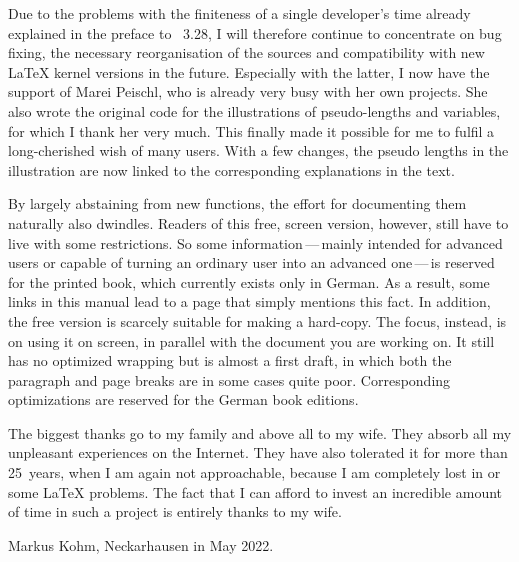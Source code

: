 Due to the problems with the finiteness of a single developer's time already
explained in the preface to \KOMAScript~3.28, I will therefore continue to
concentrate on bug fixing, the necessary reorganisation of the sources and
compatibility with new \LaTeX{} kernel versions in the future. Especially with
the latter, I now have the support of Marei Peischl, who is already very busy
with her own projects. She also wrote the original code for the illustrations
of pseudo-lengths and variables, for which I thank her very much. This finally
made it possible for me to fulfil a long-cherished wish of many users. With a
few changes, the pseudo lengths in the illustration are now linked to the
corresponding explanations in the text.


By largely abstaining from new functions, the effort for documenting them
naturally also dwindles. Readers of this free, screen version, however, still
have to live with some restrictions. So some information\,---\,mainly intended
for advanced users or capable of turning an ordinary user into an advanced
one\,---\,is reserved for the printed book, which currently exists only in
German. As a result, some links in this manual lead to a page that simply
mentions this fact. In addition, the free version is scarcely suitable for
making a hard-copy. The focus, instead, is on using it on screen, in parallel
with the document you are working on. It still has no optimized wrapping but
is almost a first draft, in which both the paragraph and page breaks are in
some cases quite poor. Corresponding optimizations are reserved for the German
book editions.


The biggest thanks go to my family and above all to my wife. They absorb all
my unpleasant experiences on the Internet. They have also tolerated it for
more than 25~years, when I am again not approachable, because I am completely
lost in \KOMAScript{} or some \LaTeX{} problems. The fact that I can afford to
invest an incredible amount of time in such a project is entirely thanks to my
wife.

\bigskip\noindent
Markus Kohm, Neckarhausen in May 2022.

\endinput


